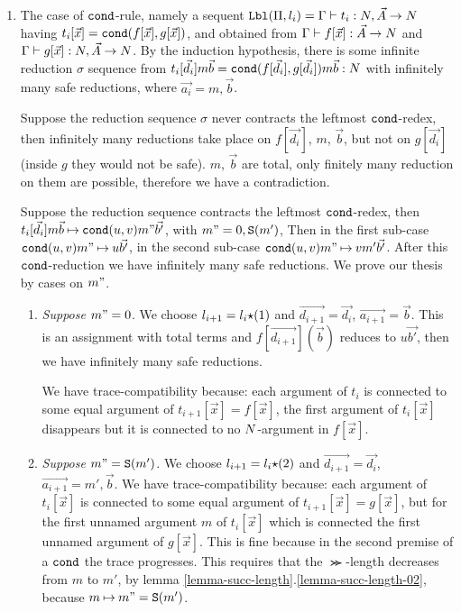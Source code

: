 \documentclass{article}
\newenvironment{proof}[1][Proof]{\begin{trivlist}
\item[\hskip \labelsep {\bfseries #1}]}{\end{trivlist}}
\begin{document}
\begin{proof}
\begin{enumerate}

\item
  The case of ${\tt cond}$-rule, namely a sequent
  ${\tt Lbl}(\Pi,l_i) = \Gamma\vdash t_i:{N},\vec{A}\rightarrow{N}$
  having $t_i[\vec{x}] = {\tt cond}(f[\vec{x}],g[\vec{x}])$,
  and obtained from 
  $\Gamma\vdash f[\vec{x}]:\vec{A}\rightarrow{N}$
  and
  $\Gamma\vdash g[\vec{x}]:{N},\vec{A}\rightarrow{N}$. 
  By the induction hypothesis, there is some infinite reduction $\sigma$ sequence from
  $t_i[\vec{d_i}]m \vec{b} = {\tt cond}(f[\vec{d_i}],g[\vec{d_i}])m\vec{b}:{N}$
  with infinitely many safe reductions,
  where $\vec{a_i} = m,\vec{b}$. 

  Suppose the reduction sequence $\sigma$ never contracts
  the leftmost ${\tt cond}$-redex, then infinitely many reductions take place on $f[\vec{d_i}]$, 
  $m$, $\vec{b}$, but not on $g[\vec{d_i}]$ (inside $g$ they would not be safe).
  $m$, $\vec{b}$ are total, only finitely many reduction on them are possible, 
  therefore we have a contradiction.


  Suppose the reduction sequence contracts the leftmost ${\tt cond}$-redex, then 
  $t_i[\vec{d_i}]m \vec{b} \mathbin{\mapsto} {\tt cond}(u,v)m"\vec{b'}$, with $m"=0, {\tt S}(m')$,
  Then  in the first sub-case ${\tt cond}(u,v)m" \mathbin{\mapsto} u \vec{b'}$, in the second sub-case
  ${\tt cond}(u,v)m" \mathbin{\mapsto} v m' \vec{b'}$. 
  After this ${\tt cond}$-reduction we have infinitely many safe reductions.
  We prove our thesis by cases on $m"$.

\begin{enumerate}
\item
  \emph{Suppose $m" = 0$}.
  We choose $l_{i+1} = l_i {\star} (1)$ and $\vec{d_{i+1}} = \vec{d_i}$,
  $\vec{a_{i+1}} = \vec{b}$. This is an assignment with total terms and $f[\vec{d_{i+1}}](\vec{b})$
  reduces to $u \vec{b'}$, then we have infinitely many safe reductions.

  We have trace-compatibility because: 
    each argument of $t_i$ is connected to some equal argument of $t_{i+1}[\vec{x}]=f[\vec{x}]$,
    the first argument of $t_i[\vec{x}]$ disappears but it is connected to no ${N}$-argument in $f[\vec{x}]$.

 \item
  \emph{Suppose $m" = {\tt S}(m')$}. 
  We choose $l_{i+1} = l_i {\star} (2)$ and $\vec{d_{i+1}} = \vec{d_i}$,
  $\vec{a_{i+1}} = m',\vec{b}$.
  We have trace-compatibility because: 
  each argument of $t_i[\vec{x}]$ is connected to some equal argument of 
    $t_{i+1}[\vec{x}]=g[\vec{x}]$,
    but for the first unnamed argument $m$ of $t_i[\vec{x}]$ 
    which is connected the first unnamed argument of $g[\vec{x}]$.
    This is fine because in the second premise of a ${\tt cond}$ 
    the trace progresses. 
    This requires that the $\Succ$-length decreases from $m$ to $m'$,
    by lemma \ref{lemma-succ-length}.\ref{lemma-succ-length-02}, 
    because $m \mathbin{\mapsto} m" = {\tt S}(m')$.


\end{enumerate}
\end{enumerate}
\end{proof}
\end{document}
